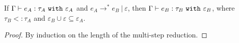 \begin{theorem}
If $ \Gamma \vdash  e_A:  \tau_A~\mathtt{with}~ \varepsilon_A$ and $e_A \longrightarrow^{*} e_B~|~\varepsilon$, then $\Gamma \vdash e_B: \tau_B~\mathtt{with}~ \varepsilon_B$, where $ \tau_B <: \tau_A$ and $\varepsilon_B \cup \varepsilon \subseteq \varepsilon_A$.
\end{theorem}

\begin{proof} By induction on the length of the multi-step reduction.
\end{proof}